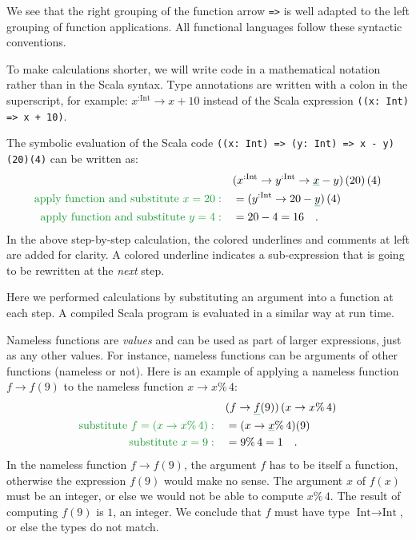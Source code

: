 We see that the right grouping of the function arrow \lstinline!=>!
is well adapted to the left grouping of function applications. All
functional languages follow these syntactic conventions.

To make calculations shorter, we will write code in a mathematical
notation rather than in the Scala syntax. Type annotations are written
with a colon in the superscript, for example: $x^{:\text{Int}}\rightarrow x+10$
instead of the Scala expression \lstinline!((x: Int) => x + 10)!.

The symbolic evaluation of the Scala code \lstinline!((x: Int) => (y: Int) => x - y)(20)(4)!
can be written as:
\begin{align*}
 & (x^{:\text{Int}}\rightarrow y^{:\text{Int}}\rightarrow\gunderline x-y)\left(20\right)\left(4\right)\\
{\color{greenunder}\text{apply function and substitute }x=20:}\quad & =(y^{:\text{Int}}\rightarrow20-\gunderline y)\left(4\right)\\
{\color{greenunder}\text{apply function and substitute }y=4:}\quad & =20-4=16\quad.
\end{align*}
In the above step-by-step calculation, the colored underlines and
comments at left are added for clarity. A colored underline indicates
a sub-expression that is going to be rewritten at the \emph{next}
step.

Here we performed calculations by substituting an argument into a
function at each step. A compiled Scala program is evaluated in a
similar way at run time.

Nameless functions are \emph{values} and can be used as part of larger
expressions, just as any other values. For instance, nameless functions
can be arguments of other functions (nameless or not). Here is an
example of applying a nameless function $f\rightarrow f(9)$ to the
nameless function $x\rightarrow x\%\,4$:
\begin{align*}
 & (f\rightarrow\gunderline f(9))\left(x\rightarrow x\%\,4\right)\\
{\color{greenunder}\text{substitute }f=\left(x\rightarrow x\%\,4\right):}\quad & =(x\rightarrow\gunderline x\%\,4)(9)\\
{\color{greenunder}\text{substitute }x=9:}\quad & =9\%\,4=1\quad.
\end{align*}
In the nameless function $f\rightarrow f(9)$, the argument $f$ has
to be itself a function, otherwise the expression $f(9)$ would make
no sense. The argument $x$ of $f(x)$ must be an integer, or else
we would not be able to compute $x\%\,4$. The result of computing
$f(9)$ is $1$, an integer. We conclude that $f$ must have type
$\text{Int}\rightarrow\text{Int}$, or else the types do not match.

